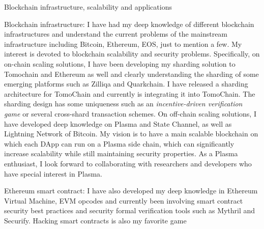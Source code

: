 \begin{cventries}

\cvinterest
{Blockchain infrastructure, scalability and applications}
{
	\begin{cvitems}
		\item{Blockchain infrastructure: I have had my deep knowledge of different blockchain infrastructures and understand the current problems of the mainstream infrastructure including Bitcoin, Ethereum, EOS, just to mention a few. My interest is devoted to blockchain scalability and security problems. Specifically, on on-chain scaling solutions, I have been developing my sharding solution to Tomochain and Ethereum as well and clearly understanding the sharding of some emerging platforms such as Zilliqa and Quarkchain. I have released a sharding architecture for TomoChain and currently is integrating it into TomoChain. The sharding design has some uniqueness such as an \textit{incentive-driven verification game} or several cross-shard transaction schemes. On off-chain scaling solutions, I have developed deep knowledge on Plasma and State Channel, as well as Lightning Network of Bitcoin. My vision is to have a main scalable blockchain on which each DApp can run on a Plasma side chain, which can significantly increase scalability while still maintaining security properties.
		As a Plasma enthusiast, I look forward to collaborating with researchers and developers who have special interest in Plasma.}
		\item{Ethereum smart contract: I have also developed my deep knowledge in Ethereum Virtual Machine, EVM opcodes and currently been involving smart contract security best practices and security formal verification tools such as Mythril and Securify. Hacking smart contracts is also my favorite game}
	\end{cvitems}
}


\end{cventries}
